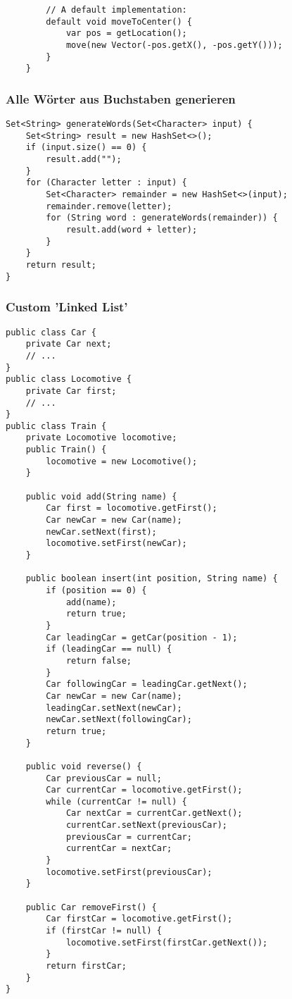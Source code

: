 \begin{multicols*}{5}
\begin{lstlisting}
		// A default implementation:
		default void moveToCenter() {
			var pos = getLocation();
			move(new Vector(-pos.getX(), -pos.getY()));
		}
	}
	\end{lstlisting}

	\columnbreak

	\subsubsection{Alle Wörter aus Buchstaben generieren}
		\begin{lstlisting}
Set<String> generateWords(Set<Character> input) { 
	Set<String> result = new HashSet<>();
	if (input.size() == 0) { 
		result.add(""); 
	}
	for (Character letter : input) {
		Set<Character> remainder = new HashSet<>(input); 
		remainder.remove(letter);
		for (String word : generateWords(remainder)) {
			result.add(word + letter);
		}
	}
	return result;
}
		\end{lstlisting}
	
	\subsubsection{Custom 'Linked List'}
	\begin{lstlisting}
public class Car {
	private Car next;
	// ...
}
public class Locomotive {
	private Car first;
	// ...
}
public class Train {
	private Locomotive locomotive;
	public Train() {
		locomotive = new Locomotive();
	}
	
	public void add(String name) {
		Car first = locomotive.getFirst();
		Car newCar = new Car(name);
		newCar.setNext(first);
		locomotive.setFirst(newCar);
	}
	
	public boolean insert(int position, String name) {
		if (position == 0) {
			add(name);
			return true;
		}
		Car leadingCar = getCar(position - 1);
		if (leadingCar == null) {
			return false;
		}
		Car followingCar = leadingCar.getNext();
		Car newCar = new Car(name);
		leadingCar.setNext(newCar);
		newCar.setNext(followingCar);
		return true;
	}
	
	public void reverse() {
		Car previousCar = null;
		Car currentCar = locomotive.getFirst();
		while (currentCar != null) {
			Car nextCar = currentCar.getNext();
			currentCar.setNext(previousCar);
			previousCar = currentCar;
			currentCar = nextCar;
		}
		locomotive.setFirst(previousCar);
	}
	
	public Car removeFirst() {
		Car firstCar = locomotive.getFirst();
		if (firstCar != null) {
			locomotive.setFirst(firstCar.getNext());
		}
		return firstCar;
	}
}
	\end{lstlisting}
	

\end{multicols*}

% 

